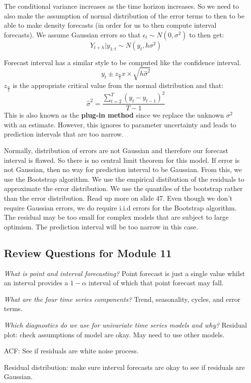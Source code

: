\documentclass[11pt, oneside]{article}
\theoremstyle{definition}
\begin{document}
The conditional variance increases as the time horizon increases. So we need to also make the assumption of normal distribution of the error terms to then to be able to make density forecasts (in order for us to then compute interval forecasts). We assume Gaussian errors so that $\epsilon_t \sim N(0,\sigma^2)$ to then get:
$$
Y_{t+h}|y_{1:t} \sim N(y_t,h\sigma^2)
$$

Forecast interval has a similar style to be computed like the confidence interval.
$$
y_t \pm z_{\frac{\alpha}{2}} x \times \sqrt{h\hat{\sigma}^2}
$$
$z_{\frac{\alpha}{2}}$ is the appropriate critical value from the normal distribution and that:
$$
\hat{\sigma}^2 = \frac{\sum\limits_{t=2}^{T}(y_t-y_{t-1})^2}{T-1}
$$
This is also known as the \textbf{plug-in method} since we replace the unknown $\sigma^2$ with an estimate. However, this ignores to parameter uncertainty and leads to prediction intervals that are too narrow.

Normally, distribution of errors are not Gaussian and therefore our forecast interval is flawed. So there is no central limit theorem for this model. If error is not Gaussian, then no way for prediction interval to be Gaussian. From this, we use the Bootstrap algorithm. We use the empirical distibution of the residuals to approximate the error distribution. We use the quantiles of the bootstrap rather than the error distribution. Read up more on slide 47. Even though we don't require Gaussian errors, we do require i.i.d errors for the Bootstrap algorithm. The residual may be too small for complex models that are subject to large optimism. The prediction interval will be too narrow in this case.

\subsection{Review Questions for Module 11}
\textit{What is point and interval forecasting?}
Point forecast is just a single value whilst an interval provides a $1 - \alpha$ interval of which that point forecast may fall.

\textit{What are the four time series components?}
Trend, seasonality, cycles, and error terms.

\textit{Which diagnostics do we use for univariate time series models and why?}
Residual plot: check assumptions of model are okay. May need to use other models.

ACF: See if residuals are white noise process.

Residual distribution: make sure interval forecasts are okay to see if residuals are Gaussian.
\end{document}
